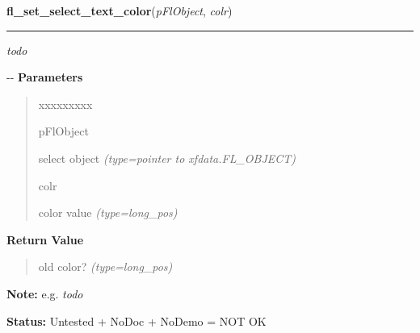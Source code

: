 \hspace{.8\funcindent}\begin{boxedminipage}{\funcwidth}

    \raggedright \textbf{fl\_set\_select\_text\_color}(\textit{pFlObject}, \textit{colr})

    \vspace{-1.5ex}

    \rule{\textwidth}{0.5\fboxrule}
\setlength{\parskip}{2ex}

\emph{todo}

-{}-
\setlength{\parskip}{1ex}
      \textbf{Parameters}
      \vspace{-1ex}

      \begin{quote}
        \begin{Ventry}{xxxxxxxxx}

          \item[pFlObject]


select object
            {\it (type=pointer to xfdata.FL\_OBJECT)}

          \item[colr]


color value
            {\it (type=long\_pos)}

        \end{Ventry}

      \end{quote}

      \textbf{Return Value}
    \vspace{-1ex}

      \begin{quote}

old color?
      {\it (type=long\_pos)}

      \end{quote}

\textbf{Note:} 
e.g. \emph{todo}


\textbf{Status:} 
Untested + NoDoc + NoDemo = NOT OK


    \end{boxedminipage}

    \label{xformslib:flselect:fl_get_select_text_font}

    \vspace{0.5ex}

